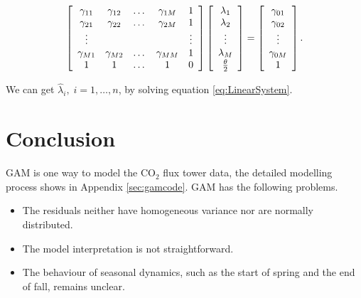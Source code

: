 \documentclass{article}
\begin{document}
\begin{equation}\label{eq:LinearSystem}
\left[\begin{array}{*{20}c}
\gamma_{11} & \gamma_{12} & \dots & \gamma_{1M} & 1\\
\gamma_{21} & \gamma_{22} & \dots & \gamma_{2M} & 1\\
\vdots    & & & & \vdots\\
\gamma_{M1} & \gamma_{M2} & \dots & \gamma_{MM} & 1\\
1 & 1 & \dots & 1 & 0\\
\end{array}\right]  \left[\begin{array}{*{20}c}
\lambda_{1}\\
\lambda_{2}\\
\vdots\\
\lambda_{M}\\
\frac{\theta}{2}\\
\end{array}\right]=\left[\begin{array}{*{20}c}
\gamma_{01}\\
\gamma_{02}\\
\vdots\\
\gamma_{0M}\\
1\\
\end{array}\right].
\end{equation}

We can get $\widehat{\lambda}_i,\;i=1,\dots,n$, by solving equation \ref{eq:LinearSystem}.

\section{Conclusion}\label{Sec:Conclusion}

GAM is one way to model the CO$_2$ flux tower data, the detailed modelling process shows in Appendix \ref{sec:gamcode}. GAM has the following problems.

\begin{itemize}
\item The residuals neither have homogeneous variance nor are normally distributed.
\item The model interpretation is not straightforward.
\item The behaviour of seasonal dynamics, such as the start of spring and the end of fall, remains unclear. 
\end{itemize}
\end{document}
